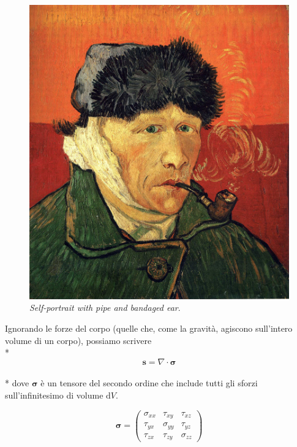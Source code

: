 \documentclass[12pt,a4paper]{article}
\numberwithin{equation}{section}
\begin{document}
\begin{figure}
    \centering
    \includegraphics[scale=0.10]{selfportrait.jpg}
    \caption{\emph{Self-portrait with pipe and bandaged ear}.}
    \label{self}
\end{figure}

Ignorando le forze del corpo (quelle che, come la gravità, agiscono sull'intero volume di un corpo), possiamo scrivere\\*
\begin{equation}
\mathbf{s} = \nabla \cdot \bm{\sigma}
\end{equation}\\*
dove $\bm{\sigma}$ è un tensore del secondo ordine che include tutti gli sforzi sull'infinitesimo di volume $\mathrm{d}V$. 

\begin{equation}
\bm{\sigma} = \begin{pmatrix}
\sigma_{xx} &  \tau_{xy} & \tau_{xz} \\
\tau_{yx} &  \sigma_{yy} & \tau_{yz} \\
\tau_{zx} &  \tau_{zy} & \sigma_{zz}
\end{pmatrix}
\end{equation}
\end{document}
